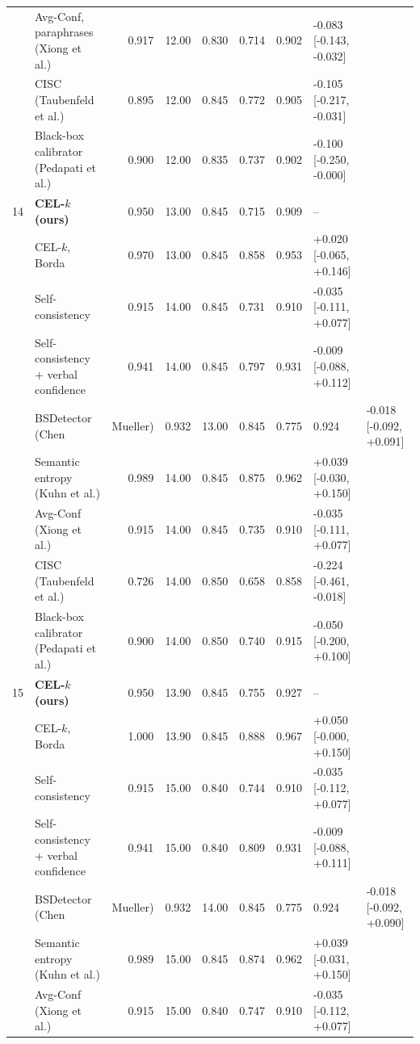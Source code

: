 \begin{table}[t]
\begin{tabular}{llrrrrrl}
 & Avg-Conf, paraphrases (Xiong et al.) & 0.917 & 12.00 & 0.830 & 0.714 & 0.902 & -0.083 [-0.143, -0.032] \\
 & CISC (Taubenfeld et al.) & 0.895 & 12.00 & 0.845 & 0.772 & 0.905 & -0.105 [-0.217, -0.031] \\
 & Black-box calibrator (Pedapati et al.) & 0.900 & 12.00 & 0.835 & 0.737 & 0.902 & -0.100 [-0.250, -0.000] \\
14 & \textbf{CEL-$k$ (ours)} & 0.950 & 13.00 & 0.845 & 0.715 & 0.909 & -- \\
 & \quad CEL-$k$, Borda & 0.970 & 13.00 & 0.845 & 0.858 & 0.953 & +0.020 [-0.065, +0.146] \\
 & Self-consistency & 0.915 & 14.00 & 0.845 & 0.731 & 0.910 & -0.035 [-0.111, +0.077] \\
 & Self-consistency + verbal confidence & 0.941 & 14.00 & 0.845 & 0.797 & 0.931 & -0.009 [-0.088, +0.112] \\
 & BSDetector (Chen & Mueller) & 0.932 & 13.00 & 0.845 & 0.775 & 0.924 & -0.018 [-0.092, +0.091] \\
 & Semantic entropy (Kuhn et al.) & 0.989 & 14.00 & 0.845 & 0.875 & 0.962 & +0.039 [-0.030, +0.150] \\
 & Avg-Conf (Xiong et al.) & 0.915 & 14.00 & 0.845 & 0.735 & 0.910 & -0.035 [-0.111, +0.077] \\
 & CISC (Taubenfeld et al.) & 0.726 & 14.00 & 0.850 & 0.658 & 0.858 & -0.224 [-0.461, -0.018] \\
 & Black-box calibrator (Pedapati et al.) & 0.900 & 14.00 & 0.850 & 0.740 & 0.915 & -0.050 [-0.200, +0.100] \\
15 & \textbf{CEL-$k$ (ours)} & 0.950 & 13.90 & 0.845 & 0.755 & 0.927 & -- \\
 & \quad CEL-$k$, Borda & 1.000 & 13.90 & 0.845 & 0.888 & 0.967 & +0.050 [-0.000, +0.150] \\
 & Self-consistency & 0.915 & 15.00 & 0.840 & 0.744 & 0.910 & -0.035 [-0.112, +0.077] \\
 & Self-consistency + verbal confidence & 0.941 & 15.00 & 0.840 & 0.809 & 0.931 & -0.009 [-0.088, +0.111] \\
 & BSDetector (Chen & Mueller) & 0.932 & 14.00 & 0.845 & 0.775 & 0.924 & -0.018 [-0.092, +0.090] \\
 & Semantic entropy (Kuhn et al.) & 0.989 & 15.00 & 0.845 & 0.874 & 0.962 & +0.039 [-0.031, +0.150] \\
 & Avg-Conf (Xiong et al.) & 0.915 & 15.00 & 0.840 & 0.747 & 0.910 & -0.035 [-0.112, +0.077] \\

\end{tabular}
\end{table}
